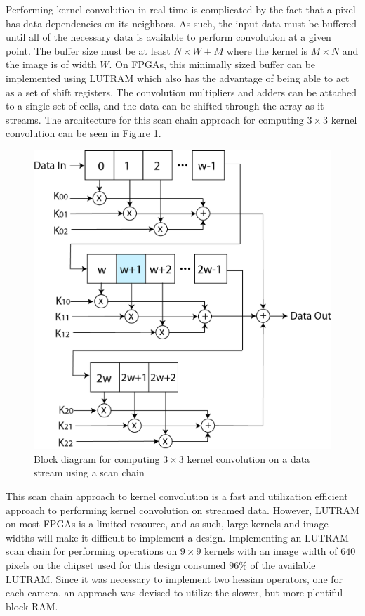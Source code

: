 \documentclass[sigconf]{acmart}
\begin{document}
Performing kernel convolution in real time is complicated by the fact that a pixel has data dependencies on its neighbors. As such, the input data must be buffered until all of the necessary data is available to perform convolution at a given point. The buffer size must be at least $N \times W + M$ where the kernel is $M \times N$ and the image is of width $W$. On FPGAs, this minimally sized buffer can be implemented using LUTRAM which also has the advantage of being able to act as a set of shift registers. The convolution multipliers and adders can be attached to a single set of cells, and the data can be shifted through the array as it streams. The architecture for this scan chain approach for computing $3 \times 3$ kernel convolution can be seen in Figure \ref{fig_block_scanchain}.

\begin{figure}[h]
	\centering
	\includegraphics[width=0.9\columnwidth]{figures/block/scanchain}
	\caption{Block diagram for computing $3 \times 3$ kernel convolution on a data stream using a scan chain}
	\label{fig_block_scanchain}
\end{figure}

This scan chain approach to kernel convolution is a fast and utilization efficient approach to performing kernel convolution on streamed data. However, LUTRAM on most FPGAs is a limited resource, and as such, large kernels and image widths will make it difficult to implement a design. Implementing an LUTRAM scan chain for performing operations on $9 \times 9$ kernels with an image width of $640$ pixels on the chipset used for this design consumed $96\%$ of the available LUTRAM. Since it was necessary to implement two hessian operators, one for each camera, an approach was devised to utilize the slower, but more plentiful block RAM.
\end{document}
